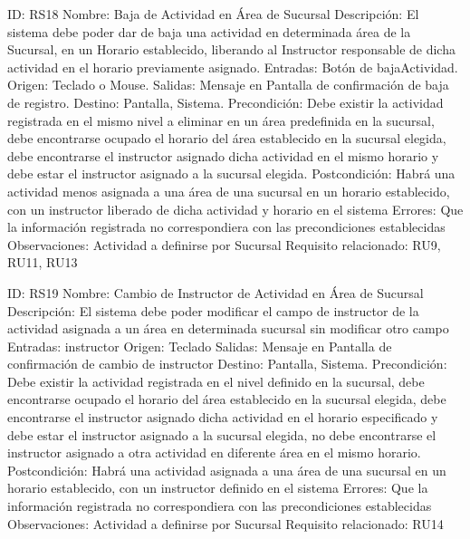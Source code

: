 ID: RS18
Nombre: Baja de Actividad en Área de Sucursal
Descripción: El sistema debe poder dar de baja una actividad en determinada área de la Sucursal, en un Horario establecido, liberando al Instructor responsable de dicha actividad en el horario previamente asignado.
Entradas: Botón de bajaActividad.
Origen: Teclado o Mouse.
Salidas: Mensaje en Pantalla de confirmación de baja de registro. 
Destino: Pantalla, Sistema.
Precondición: Debe existir la actividad registrada en el mismo nivel a eliminar en un área predefinida en la sucursal, debe encontrarse ocupado el horario del área establecido en la sucursal elegida, debe encontrarse el instructor asignado dicha actividad en el mismo horario y debe estar el instructor asignado a la sucursal elegida.
Postcondición: Habrá una actividad menos asignada a una área de una sucursal en un horario establecido, con un instructor liberado de dicha actividad y horario en el sistema
Errores: Que la información registrada no correspondiera con las precondiciones establecidas
Observaciones: Actividad a definirse por Sucursal
Requisito relacionado: RU9, RU11, RU13

ID: RS19
Nombre: Cambio de Instructor de Actividad en Área de Sucursal
Descripción: El sistema debe poder modificar el campo de instructor de la actividad asignada a un área en determinada sucursal sin modificar otro campo
Entradas: instructor
Origen: Teclado
Salidas: Mensaje en Pantalla de confirmación de cambio de instructor
Destino: Pantalla, Sistema.
Precondición: Debe existir la actividad registrada en el nivel definido en la sucursal, debe encontrarse ocupado el horario del área establecido en la sucursal elegida, debe encontrarse el instructor asignado dicha actividad en el horario especificado y debe estar el instructor asignado a la sucursal elegida, no debe encontrarse el instructor asignado a otra actividad en diferente área en el mismo horario.
Postcondición: Habrá una actividad asignada a una área de una sucursal en un horario establecido, con un instructor definido en el sistema
Errores: Que la información registrada no correspondiera con las precondiciones establecidas
Observaciones: Actividad a definirse por Sucursal
Requisito relacionado: RU14
 

